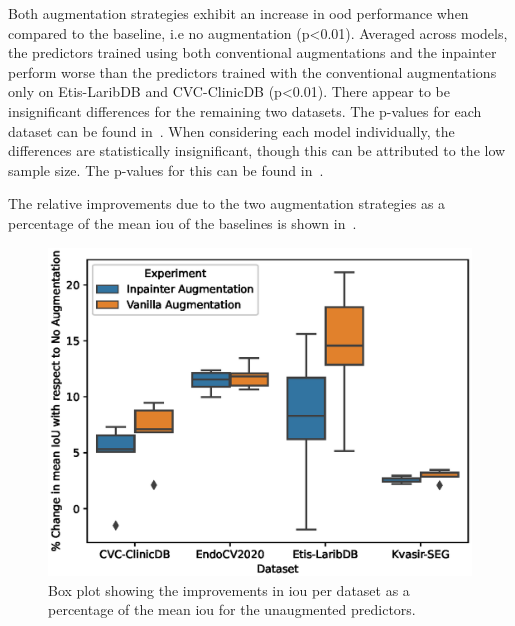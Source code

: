 Both augmentation strategies exhibit an increase in \gls{ood} performance when compared to the baseline, i.e no augmentation (p<0.01). Averaged across models, the predictors trained using both conventional augmentations and the inpainter perform worse than the predictors trained with the conventional augmentations only on Etis-LaribDB and CVC-ClinicDB (p<0.01). There appear to be insignificant differences for the remaining two datasets. The p-values for each dataset can be found in~. When considering each model individually, the differences are statistically insignificant, though this can be attributed to the low sample size. The p-values for this can be found in~. 

The relative improvements due to the two augmentation strategies as a percentage of the mean \gls{iou} of the baselines is shown in~. 

\begin{figure}[htb]
    \centering
    \includegraphics[width=\linewidth]{illustrations/augmentation_plot.eps}
    \caption[Augmentation Improvements]{Box plot showing the improvements in \gls{iou} per dataset as a percentage of the mean \gls{iou} for the unaugmented predictors. }
    \label{fig:augmentations}
\end{figure}

